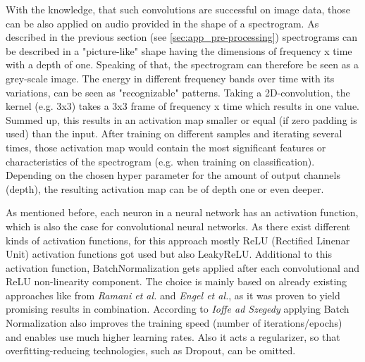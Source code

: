 With the knowledge, that such convolutions are successful on image data, those can be also applied on audio provided in the shape of a spectrogram. As described in the previous section (see \ref{sec:app_pre-processing}) spectrograms can be described in a "picture-like" shape having the dimensions of frequency x time with a depth of one. Speaking of that, the spectrogram can therefore be seen as a grey-scale image. The energy in different frequency bands over time with its variations, can be seen as "recognizable" patterns. 
Taking a 2D-convolution, the kernel (e.g. 3x3) takes a 3x3 frame of frequency x time which results in one value. Summed up, this results in an activation map smaller or equal (if zero padding is used) than the input. After training on different samples and iterating several times, those activation map would contain the most significant features or characteristics of the spectrogram (e.g. when training on classification).
Depending on the chosen hyper parameter for the amount of output channels (depth), the resulting activation map can be of depth one or even deeper. 

As mentioned before, each neuron in a neural network has an activation function, which is also the case for convolutional neural networks. As there exist different kinds of activation functions, for this approach mostly ReLU (Rectified Linenar Unit) activation functions got used but also LeakyReLU. Additional to this activation function, BatchNormalization gets applied after each convolutional and ReLU non-linearity component. The choice is mainly based on already existing approaches like from \textit{Ramani et al.}\cite{Ramani2018} and \textit{Engel et al.}\cite{Engel2017}, as it was proven to yield promising results in combination. According to \textit{Ioffe ad Szegedy} \cite{ioffe2015batch} applying Batch Normalization also improves the training speed (number of iterations/epochs) and enables use much higher learning rates. Also it acts a regularizer, so that overfitting-reducing technologies, such as Dropout, can be omitted.

